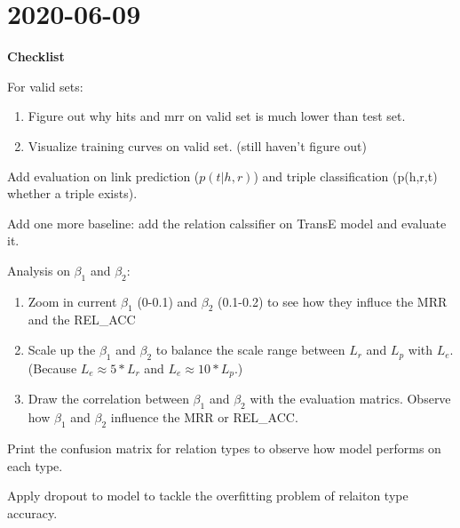 \chapter{2020-06-09}

\textbf{Checklist}
\begin{todolist}
    \item[\done] For valid sets:
        \begin{enumerate}
            \item Figure out why hits and mrr on valid set is much lower than test set. 
            \item Visualize training curves on valid set. (still haven't figure out) 
        \end{enumerate}
    \item Add evaluation on link prediction ($p(t|h,r)$) and triple classification (p(h,r,t) whether a triple exists).
    \item Add one more baseline: add the relation calssifier on TransE model and evaluate it. 
    \item Analysis on $\beta_1$ and $\beta_2$: 
    \begin{enumerate}
        \item Zoom in current $\beta_1$ (0-0.1) and $\beta_2$ (0.1-0.2) to see how they influce the MRR and the  REL\_ACC 
        \item Scale up the $\beta_1$ and $\beta_2$ to balance the scale range between $L_r$ and $L_p$ with $L_e$. (Because $L_e \approx 5*L_r$ and $L_e \approx 10*L_p$.) 
        \item Draw the correlation between $\beta_1$ and $\beta_2$ with the evaluation matrics. Observe how $\beta_1$ and $\beta_2$ influence the MRR or REL\_ACC.
    \end{enumerate}
    \item[\done] Print the confusion matrix for relation types to observe how model performs on each type.
    \item[\done] Apply dropout to model to tackle the overfitting problem of relaiton type accuracy.  
\end{todolist}


\clearpage
